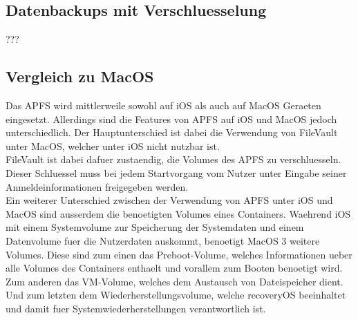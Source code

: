 \subsection{Datenbackups mit Verschluesselung}
???
\subsection{Vergleich zu MacOS}
Das APFS wird mittlerweile sowohl auf iOS als auch auf MacOS Geraeten eingesetzt. Allerdings sind die Features von APFS auf iOS und MacOS jedoch unterschiedlich. Der Hauptunterschied ist dabei die Verwendung von FileVault unter MacOS, welcher unter iOS nicht nutzbar ist.\\
FileVault ist dabei dafuer zustaendig, die Volumes des APFS zu verschluesseln. Dieser Schluessel muss bei jedem Startvorgang vom Nutzer unter Eingabe seiner Anmeldeinformationen freigegeben werden.\\
Ein weiterer Unterschied zwischen der Verwendung von APFS unter iOS und MacOS sind ausserdem die benoetigten Volumes eines Containers.
Waehrend iOS mit einem Systemvolume zur Speicherung der Systemdaten und einem Datenvolume fuer die Nutzerdaten auskommt, benoetigt MacOS 3 weitere Volumes. Diese sind zum einen das Preboot-Volume, welches Informationen ueber alle Volumes des Containers enthaelt und vorallem zum Booten benoetigt wird. Zum anderen das VM-Volume, welches dem Austausch von Dateispeicher dient. Und zum letzten dem Wiederherstellungsvolume, welche recoveryOS beeinhaltet und damit fuer Systemwiederherstellungen verantwortlich ist.
